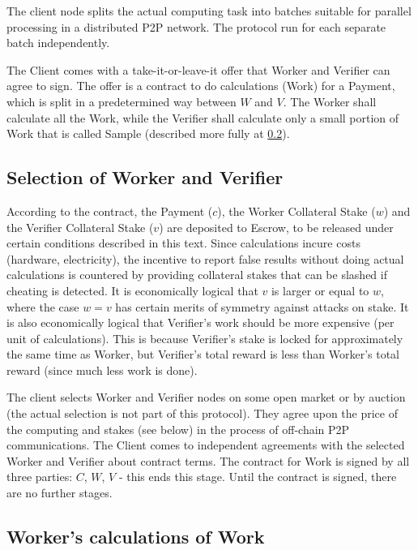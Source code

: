 \documentclass{article}
\begin{document}
The client node splits the actual computing task into \gls{batches} suitable for parallel processing in a distributed P2P network. The protocol run for each separate batch independently.

The Client comes with a take-it-or-leave-it offer that Worker and Verifier can agree to sign. The offer is a contract to do calculations (Work) for a Payment, which is split in a predetermined way between $W$ and $V$. The Worker shall calculate all the Work, while the Verifier shall calculate only a small portion of Work that is called Sample (described more fully at \ref{calculation}). 

\subsection{Selection of Worker and Verifier}
\label{selection}

According to the contract, the \Gls{Payment} ($c$), the \Gls{Worker Collateral Stake} ($w$) and the \Gls{Verifier Collateral Stake} ($v$) are deposited to \Gls{Escrow}, to be released under certain conditions described in this text. Since calculations incure costs (hardware, electricity), the incentive to report false results without doing actual calculations is countered by providing collateral stakes that can be slashed if cheating is detected. It is economically logical that $v$ is larger or equal to $w$, where the case $w=v$ has certain merits of symmetry against attacks on stake. It is also economically logical that \Gls{Verifier}'s work should be more expensive (per unit of calculations). This is because \Gls{Verifier}'s stake is locked for approximately the same time as \Gls{Worker}, but \Gls{Verifier}'s total reward is less than Worker's total reward (since much less work is done).

The client selects Worker and Verifier nodes on some open market or by auction (the actual selection is not part of this protocol). They agree upon the price of the computing and stakes (see below) in the process of off-chain P2P communications. The Client comes to independent agreements with the selected Worker and Verifier about contract terms. The contract for Work is signed by all three parties: $C$, $W$, $V$ - this ends this stage. Until the contract is signed, there are no further stages.

\subsection{Worker's calculations of Work}
\label{calculation}
\end{document}
